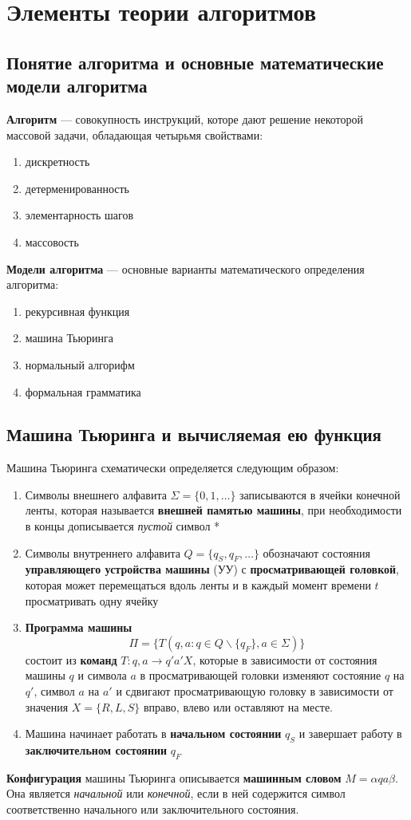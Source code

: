 \section{Элементы теории алгоритмов}
\subsection{Понятие алгоритма и основные математические модели алгоритма}
\dftion \textbf{Алгоритм} --- совокупность инструкций, которе дают решение некоторой массовой задачи, обладающая четырьмя свойствами:
\begin{enumerate}
    \item дискретность
    \item детерменированность
    \item элементарность шагов
    \item массовость
\end{enumerate}

\dftion \textbf{Модели алгоритма} --- основные варианты математического определения алгоритма:
\begin{enumerate}
    \item рекурсивная функция
    \item машина Тьюринга
    \item нормальный алгорифм
    \item формальная грамматика
\end{enumerate}
\subsection{Машина Тьюринга и вычисляемая ею функция}
Машина Тьюринга схематически определяется следующим образом:
\begin{enumerate}
    \item Символы внешнего алфавита $\Sigma = \{0, 1, \dots\}$ записываются в ячейки конечной ленты, которая называется \textbf{внешней памятью машины}, при необходимости в концы дописывается \textit{пустой} символ *
    \item Символы внутреннего алфавита $Q = \{q_S, q_F, \dots\}$ обозначают состояния \textbf{управляющего устройства машины} (УУ) с \textbf{просматривающей головкой}, которая может перемещаться вдоль ленты и в каждый момент времени $t$ просматривать одну ячейку
    \item \textbf{Программа машины} $$\Pi = \{T(q, a : q \in Q \backslash \{q_F\}, a \in \Sigma)\}$$ состоит из \textbf{команд} $T: q, a \to q' a' X$, которые в зависимости от состояния машины $q$ и символа $a$ в просматривающей головки изменяют состояние $q$ на $q'$, символ $a$ на $a'$ и сдвигают просматривающую головку в зависимости от значения $X = \{R, L, S\}$ вправо, влево или оставляют на месте.
    \item Машина начинает работать в \textbf{начальном состоянии} $q_S$ и завершает работу в \textbf{заключительном состоянии} $q_F$
\end{enumerate}

\dftion \textbf{Конфигурация} машины Тьюринга описывается \textbf{машинным словом} $M = \alpha q a \beta$. Она является \textit{начальной} или \textit{конечной}, если в ней содержится символ соответственно начального или заключительного состояния.